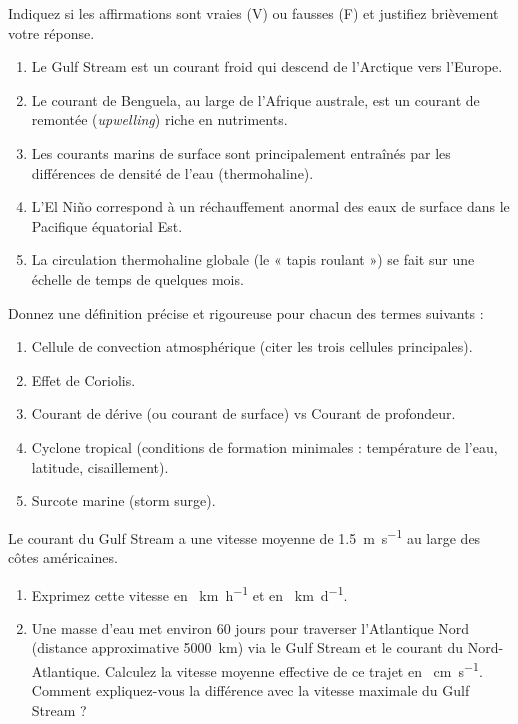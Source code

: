 \documentclass[11pt]{article}
\begin{document}
\begin{exercice}
Indiquez si les affirmations sont vraies (V) ou fausses (F) et justifiez brièvement votre réponse.
\begin{enumerate}
    \item Le Gulf Stream est un courant froid qui descend de l'Arctique vers l'Europe.
    \item Le courant de Benguela, au large de l'Afrique australe, est un courant de remontée (\emph{upwelling}) riche en nutriments.
    \item Les courants marins de surface sont principalement entraînés par les différences de densité de l'eau (thermohaline).
    \item L'El Niño correspond à un réchauffement anormal des eaux de surface dans le Pacifique équatorial Est.
    \item La circulation thermohaline globale (le « tapis roulant ») se fait sur une échelle de temps de quelques mois.
\end{enumerate}
\end{exercice}

\begin{exercice}
Donnez une définition précise et rigoureuse pour chacun des termes suivants :
\begin{enumerate}
    \item Cellule de convection atmosphérique (citer les trois cellules principales).
    \item Effet de Coriolis.
    \item Courant de dérive (ou courant de surface) vs Courant de profondeur.
    \item Cyclone tropical (conditions de formation minimales : température de l'eau, latitude, cisaillement).
    \item Surcote marine (storm surge).
\end{enumerate}
\end{exercice}

\begin{exercice}
Le courant du Gulf Stream a une vitesse moyenne de \SI{1,5}{\meter\per\second} au large des côtes américaines.
\begin{enumerate}
    \item Exprimez cette vitesse en \SI{}{\kilo\meter\per\hour} et en \SI{}{\kilo\meter\per\day}.
    \item Une masse d'eau met environ 60 jours pour traverser l'Atlantique Nord (distance approximative \SI{5000}{\kilo\meter}) via le Gulf Stream et le courant du Nord-Atlantique. Calculez la vitesse moyenne effective de ce trajet en \SI{}{\centi\meter\per\second}. Comment expliquez-vous la différence avec la vitesse maximale du Gulf Stream ?
\end{enumerate}
\end{exercice}
\end{document}

